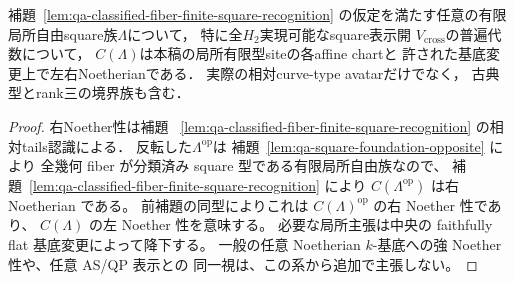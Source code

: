 \begin{corollary}[square完成の左右Noether性]
\label{cor:qa-relative-square-completion-two-sided-noetherian}
補題~\ref{lem:qa-classified-fiber-finite-square-recognition}
の仮定を満たす任意の有限局所自由square族$\Lambda$について，
特に全$H_2$実現可能なsquare表示開
$V_{\mathrm{cross}}$の普遍代数について，
$C(\Lambda)$は本稿の局所有限型siteの各affine chartと
許された基底変更上で左右Noetherianである．
実際の相対curve-type avatarだけでなく，
古典型とrank三の境界族も含む．
\end{corollary}
\begin{proof}
右Noether性は補題~
\ref{lem:qa-classified-fiber-finite-square-recognition}
の相対tails認識による．
反転した$\Lambda^{\mathrm{op}}$は
補題~\ref{lem:qa-square-foundation-opposite} により
全幾何 fiber が分類済み square 型である有限局所自由族なので、
補題~\ref{lem:qa-classified-fiber-finite-square-recognition} により
$C(\Lambda^{\mathrm{op}})$ は右 Noetherian である。
前補題の同型によりこれは $C(\Lambda)^{\mathrm{op}}$ の右 Noether 性であり、
$C(\Lambda)$ の左 Noether 性を意味する。
必要な局所主張は中央の faithfully flat 基底変更によって降下する。
一般の任意 Noetherian $k$-基底への強 Noether 性や、任意 AS/QP 表示との
同一視は、この系から追加で主張しない。
\end{proof}

